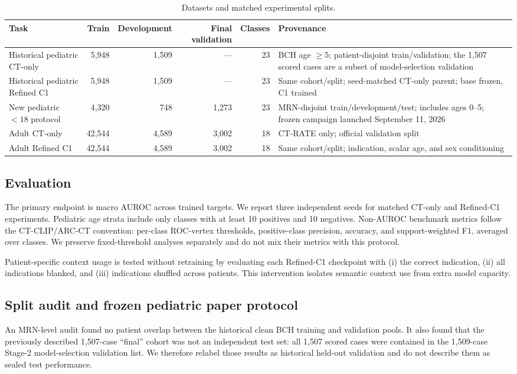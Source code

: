 \documentclass[10pt,twocolumn]{article}
\begin{document}
\begin{table}[t]
\centering
\caption{Datasets and matched experimental splits.}
\label{tab:cohorts}
\begin{tabular}{@{}lrrrrp{5.7cm}@{}}
\toprule
Task & Train & Development & Final validation & Classes & Provenance \\
\midrule
Historical pediatric CT-only & 5,948 & 1,509 & --- & 23 & BCH age $\geq5$; patient-disjoint train/validation; the 1,507 scored cases are a subset of model-selection validation \\
Historical pediatric Refined C1 & 5,948 & 1,509 & --- & 23 & Same cohort/split; seed-matched CT-only parent; base frozen, C1 trained \\
New pediatric $<18$ protocol & 4,320 & 748 & 1,273 & 23 & MRN-disjoint train/development/test; includes ages 0--5; frozen campaign launched September 11, 2026 \\
Adult CT-only & 42,544 & 4,589 & 3,002 & 18 & CT-RATE only; official validation split \\
Adult Refined C1 & 42,544 & 4,589 & 3,002 & 18 & Same cohort/split; indication, scalar age, and sex conditioning \\
\bottomrule
\end{tabular}
\end{table}

\subsection{Evaluation}
The primary endpoint is macro AUROC across trained targets. We report three
independent seeds for matched CT-only and Refined-C1 experiments. Pediatric age
strata include only classes with at least 10 positives and 10 negatives.
Non-AUROC benchmark metrics follow the CT-CLIP/ARC-CT convention: per-class
ROC-vertex thresholds, positive-class precision, accuracy, and support-weighted
F1, averaged over classes. We preserve fixed-threshold analyses separately and
do not mix their metrics with this protocol.

Patient-specific context usage is tested without retraining by evaluating each
Refined-C1 checkpoint with (i) the correct indication, (ii) all indications
blanked, and (iii) indications shuffled across patients. This intervention
isolates semantic context use from extra model capacity.

\subsection{Split audit and frozen pediatric paper protocol}
An MRN-level audit found no patient overlap between the historical clean BCH
training and validation pools. It also found that the previously described
1,507-case ``final'' cohort was not an independent test set: all 1,507 scored
cases were contained in the 1,509-case Stage-2 model-selection validation
list. We therefore relabel those results as historical held-out validation and
do not describe them as sealed test performance.
\end{document}

